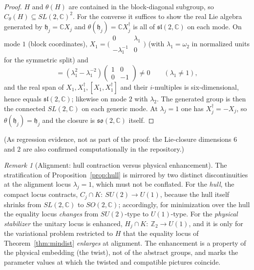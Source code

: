 \documentclass[11pt]{article}
\theoremstyle{definition}
\theoremstyle{remark}
\newtheorem{remark}[theorem]{Remark}
\newcommand{\C}{\mathbb{C}}
\newcommand{\Z}{\mathbb{Z}}
\newcommand{\w}{\omega}
\newcommand{\dg}{\dagger}
\begin{document}
\begin{proof}
$H$ and $\theta(H)$ are contained in the block-diagonal subgroup, so
$C_\theta(H)\subseteq SL(2,\C)^2$.  For the converse it suffices to show the
real Lie algebra generated by
$\mathfrak h_j=\C X_j$ and $\theta(\mathfrak h_j)=\C X_j^{\dg}$ is all of
$\mathfrak{sl}(2,\C)$ on each mode.  On mode $1$ (block coordinates),
$X_1=\big(\begin{smallmatrix}0&\lambda_1\\-\lambda_1^{-1}&0\end{smallmatrix}\big)$
(with $\lambda_1=\w_2$ in normalized units for the symmetric split) and
\begin{equation}
[X_1,X_1^{\dg}]=(\lambda_1^2-\lambda_1^{-2})
\begin{pmatrix}1&0\\0&-1\end{pmatrix}\neq0
\qquad(\lambda_1\neq1),
\end{equation}
and the real span of
$X_1,X_1^{\dg},[X_1,X_1^{\dg}]$ and their $i$-multiples is six-dimensional,
hence equals $\mathfrak{sl}(2,\C)$; likewise on mode $2$ with $\lambda_2$.
The generated group is then the connected $SL(2,\C)$ on each generic mode.
At $\lambda_j=1$ one has $X_j^{\dg}=-X_j$, so
$\theta(\mathfrak h_j)=\mathfrak h_j$ and the closure is
$\mathfrak{so}(2,\C)$ itself.
\end{proof}

\noindent
(As regression evidence, not as part of the proof: the Lie-closure
dimensions $6$ and $2$ are also confirmed computationally in the
repository.)

\begin{remark}[Alignment: hull contraction versus physical enhancement]
\label{rem:enhancement}
The stratification of Proposition~\ref{prop:hull} is mirrored by two
distinct discontinuities at the alignment locus $\lambda_j=1$, which must
not be conflated.  For the
\emph{hull}, the compact locus contracts, $C_j\cap K:\ SU(2)\to U(1)$,
because the hull itself shrinks from $SL(2,\C)$ to $SO(2,\C)$; accordingly,
for minimization over the hull the equality locus \emph{changes} from
$SU(2)$-type to $U(1)$-type.  For the \emph{physical stabilizer} the
unitary locus is enhanced, $H_j\cap K:\ \Z_2\to U(1)$, and it is only for
the variational problem restricted to $H$ that the equality locus of
Theorem~\ref{thm:mindist} \emph{enlarges} at alignment.  The enhancement is
a property of the physical embedding (the twist), not of the abstract
groups, and marks the parameter values at which the twisted and compatible
pictures coincide.
\end{remark}
\end{document}

